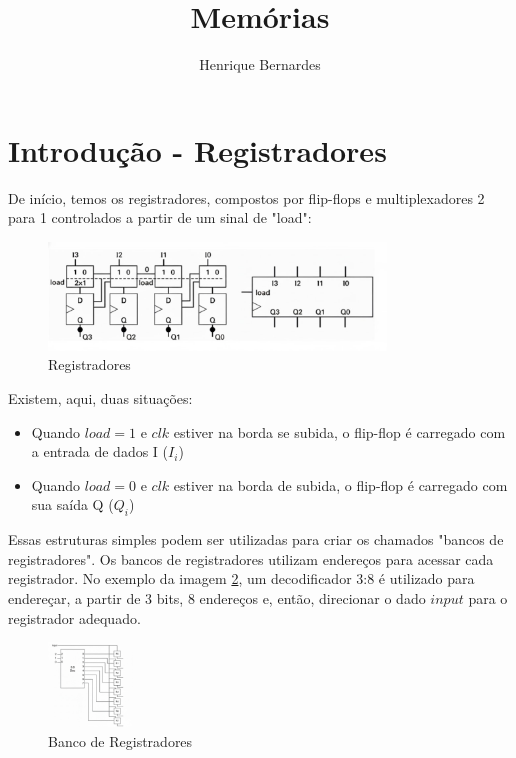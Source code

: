 \documentclass{article}
\begin{document}
\title{Memórias}
\author{Henrique Bernardes}
\maketitle
\thispagestyle{empty}
\section{Introdução - Registradores}
De início, temos os registradores, compostos por flip-flops e multiplexadores 2 para 1 controlados a partir de um sinal de "load":

\begin{figure}[h!] 
    \centering 
    \includegraphics[width=0.8\textwidth]{registradores.jpg} 
    \caption{Registradores} 
    \label{fig:registradores} 
\end{figure}

Existem, aqui, duas situações:
\begin{itemize}
     \item Quando $ load = 1$ e $clk$ estiver na borda se subida, o flip-flop é carregado com a entrada de dados I ($I_i$)

     \item Quando $load = 0$ e $clk$ estiver na borda de subida, o flip-flop é carregado com sua saída Q ($Q_i$)
\end{itemize}


Essas estruturas simples podem ser utilizadas para criar os chamados "bancos de registradores". Os bancos de registradores utilizam endereços para acessar cada registrador. No exemplo da imagem \ref{fig:bancoderegistradores}, um decodificador 3:8 é utilizado para endereçar, a partir de 3 bits, 8 endereços e, então, direcionar o dado $input$ para o registrador adequado.

\begin{figure}[h!] 
    \centering 
    \includegraphics[width=0.2\textwidth]{bancoderegistradores.jpg} %
    \caption{Banco de Registradores} 
    \label{fig:bancoderegistradores} 
\end{figure}
\end{document}
